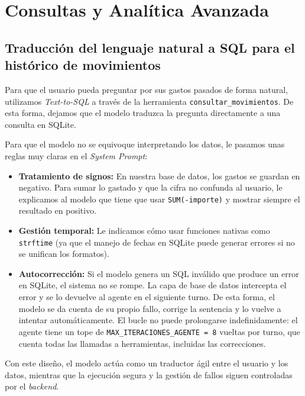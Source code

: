 \section{Consultas y Analítica Avanzada}

\subsection{Traducción del lenguaje natural a SQL para el histórico de movimientos}

Para que el usuario pueda preguntar por sus gastos pasados de forma natural, 
utilizamos \textit{Text-to-SQL} a través de la herramienta \texttt{consultar\_movimientos}. 
De esta forma, dejamos que el modelo traduzca la pregunta directamente a una consulta en SQLite.

Para que el modelo no se equivoque interpretando los datos, le pasamos unas reglas muy claras en el 
\textit{System Prompt}:

\begin{itemize}

    \item \textbf{Tratamiento de signos:} En nuestra base de datos, los gastos se guardan en negativo. 
    Para sumar lo gastado y que la cifra no confunda al usuario, le explicamos al modelo que tiene que usar 
    \texttt{SUM(-importe)} y mostrar siempre el resultado en positivo.
    
    \item \textbf{Gestión temporal:} Le indicamos cómo usar funciones nativas como \texttt{strftime} (ya que el manejo de fechas en SQLite puede generar errores si no se unifican los formatos).
    
    \item \textbf{Autocorrección:} Si el modelo genera un SQL inválido que produce un error en SQLite, el sistema 
    no se rompe. La capa de base de datos intercepta el error y se lo devuelve al agente en el siguiente turno. 
    De esta forma, el modelo se da cuenta de su propio fallo, corrige la sentencia y lo vuelve a intentar automáticamente.
    El bucle no puede prolongarse indefinidamente: el agente tiene un tope de
    \texttt{MAX\_ITERACIONES\_AGENTE = 8} vueltas por turno, que cuenta todas las
    llamadas a herramientas, incluidas las correcciones.
\end{itemize}



\newpage
Con este diseño, el modelo actúa como un traductor ágil entre el usuario y los datos, mientras que la ejecución 
segura y la gestión de fallos siguen controladas por el \emph{backend}.

